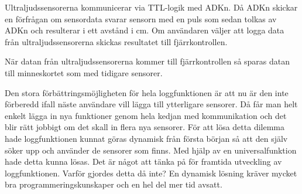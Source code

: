 Ultraljudssensorerna kommunicerar via TTL-logik med ADKn. Då ADKn skickar en förfrågan om sensordata svarar sensorn med en puls som
sedan tolkas av ADKn och resulterar i ett avstånd i cm. Om användaren väljer att logga data från ultraljudssensorerna skickas
resultatet till fjärrkontrollen.

När datan från ultraljudssensorerna kommer till fjärrkontrollen så sparas datan till minneskortet som med tidigare sensorer.

Den stora förbättringsmöjligheten för hela loggfunktionen är att nu är den inte förberedd ifall näste användare vill lägga till ytterligare sensorer. 
Då får man helt enkelt lägga in nya funktioner genom hela kedjan med kommunikation och det blir rätt jobbigt om det skall in flera nya sensorer. 
För att lösa detta dilemma hade loggfunktionen kunnat göras dynamisk från första början så att den själv söker upp och använder de sensorer som finns. Med hjälp av en universalfunktion hade detta kunna lösas. Det är något att tänka på för framtida utveckling av loggfunktionen. Varför gjordes detta då inte? En dynamisk lösning kräver mycket bra programmeringskunskaper och en hel del mer tid avsatt. 
